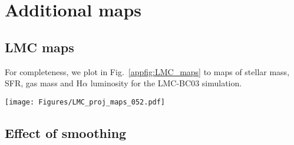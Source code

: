 \documentclass[fleqn,usenatbib]{mnras}
\begin{document}



\appendix


\section{Additional maps}
\label{appsec:maps}


\subsection{LMC maps}
\label{appsec:LMC_maps}

For completeness, we plot in Fig.~\ref{appfig:LMC_maps} to maps of stellar mass, SFR, gas mass and H$\alpha$ luminosity for the LMC-BC03 simulation.

\begin{figure*}
\texttt{[image: Figures/LMC\_proj\_maps\_052.pdf]}
\caption{LMC-BC03 simulation at 713 Myr. This figure follows the same layout as Fig.~\ref{fig:MW_maps}: maps of stellar mass, SFR (averaged over the past 100\,Myr), gas mass and H$\alpha$ luminosity are shown from left to right. The stellar mass, SFR, and H$\alpha$ are smoothed by 50 pc in order to increase visibility. The top and bottom panels show face-on and edge-on projections, respectively. The dimensions of each map are $30\times30$ kpc (the ruler in the bottom left indicates 3 kpc).}
\label{appfig:LMC_maps}
\end{figure*}



\subsection{Effect of smoothing}
\label{appsec:smoothing}
\end{document}
